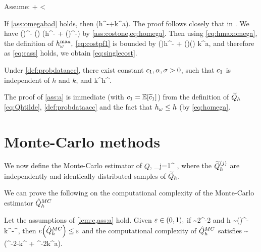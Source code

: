 \label{ass:omegabad}
Assume:
\beq\label{eq:cass}
\cth \de \EXP{\cthtilde}+ \EXP{\cthtilde\Co^{-\gamma}} < \infty
\eeq
\eas

\label{lem:c}
If \cref{ass:omegabad} holds, then 
\beq\label{eq:singlecost}
\EXP{\Cost{\Qh}} \leq \cth \mleft(h^{-\gamma}+k^{a\gamma}\mright).
\eeq
\ele
{}
The proof follows closely that in \cite[Lemma 5.8]{GrPaSc:19}.
We have
\beq\label{eq:costpf1}
\Cost{\uhtilde(\omega)} \leq \cthtilde(\omega)\homega^{-\gamma} \leq \cthtilde(\omega) \mleft(h^{-\gamma} + \mleft(\hmaxomega\mright)^{-\gamma}\mright)
\eeq
by \cref{ass:costone,eq:homega}. Then using \cref{eq:hmaxomega}, the definition of $h^{\max}_{\omega},$ \cref{eq:costpf1} is bounded by
\beq\label{eq:costpf2}
\cthtilde(\omega)h^{-\gamma} + \mleft(\cthtilde\Co\mright)(\omega) k^{a\gamma},
\eeq
and therefore as \cref{eq:cass} holds, we obtain \cref{eq:singlecost}.
\epf

\label{ass:a}
Under \cref{def:probdataacc}, there exist constant $c_{1}, \alpha, \sigma> 0$, such that $c_{1}$ is independent of $h$ and $k$, and
\beqs
{} \leq \co k^\sigma h^{\alpha}.
\eeqs
\ele

The proof of \cref{ass:a} is immediate (with $\co = \EXP{\cotilde}$) from the definition of $\widetilde{Q}_{h}$ \cref{eq:Qhtilde}, \cref{def:probdataacc} and the fact that $h_{\omega} \leq h$ (by \cref{eq:homega}.
\epf


\section{Monte-Carlo methods}

We now define the Monte-Carlo estimator of $Q$,
\beqs
\QhatMC \de {} \sum_{j=1}^{\NMC} \Qhtildesj,
\eeqs
where the $\widetilde{Q}_{h}^{(j)}$ are independently and identically distributed samples of $\widetilde{Q}_{h}.$

We can prove the following  on the computational complexity of the Monte-Carlo estimator $\hat{Q}^{MC}_{h}$

\label{thm:hhmc}
Let the assumptions of \cref{lem:c,ass:a} hold. Given $\varepsilon \in (0,1),$ if
\beq\label{eq:NMC}
\NMC  \sim 2\VAR{\Qhtilde}\eps^{-2}
\eeq
and
\beq\label{eq:hMC}
h \sim \mleft(\co\mright)^{-}k^{-\frac\sigma\alpha}\eps^{},
\eeq
then $\err{\QhatMC} \leq \eps$ and the computational complexity of $\hat{Q}^{MC}_{h}$ satisfies
\beqs
\EXP{\CMC} \sim \VAR{\Qhtilde}\mleft(\eps^{-2-\frac{\gamma}{\alpha}}k^{\frac{\gamma\sigma}\alpha} + \eps^{-2}k^{a\gamma}\mright).
\eeqs
\enth

